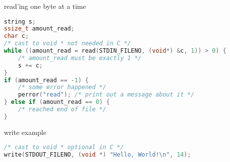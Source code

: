 


\begin{frame}[fragile,label=readExample1]{read'ing one byte at a time}
\begin{lstlisting}[language=C++,style=small,morekeywords=ssize\_t,morekeywords=string]
string s;
ssize_t amount_read;
char c;
/* cast to void * not needed in C */
while ((amount_read = read(STDIN_FILENO, (void*) &c, 1)) > 0) {
    /* amount_read must be exactly 1 */
    s += c;
}
if (amount_read == -1) {
    /* some error happened */
    perror("read"); /* print out a message about it */
} else if (amount_read == 0) {
    /* reached end of file */
}
\end{lstlisting}
\end{frame}



\begin{frame}[fragile,label=writeExample]{write example}
\begin{lstlisting}[language=C++,style=small]
/* cast to void * optional in C */
write(STDOUT_FILENO, (void *) "Hello, World!\n", 14);
\end{lstlisting}
\end{frame}

